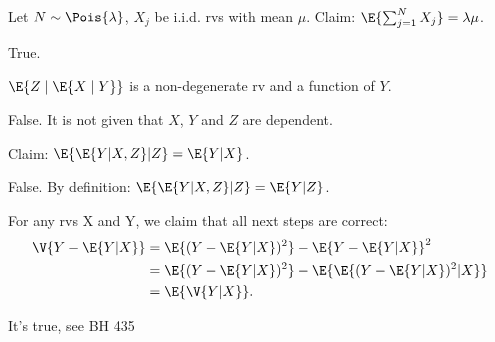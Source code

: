 \documentclass[tf-tutorial-all.tex]{subfiles}
\begin{document}
\begin{truefalse}
Let $N \sim \Pois{\lambda}$, $X_j$ be i.i.d. rvs with mean $\mu$. Claim: $\E{\sum_{j=1}^NX_j}=\lambda\mu$.
\begin{solution}
True.
\end{solution}
\end{truefalse}

\begin{truefalse}
$\E{Z \mid \E{X \mid Y}}$ is a non-degenerate rv and a function of $Y$.
\begin{solution}
False. It is not given that $X$, $Y$ and $Z$ are dependent.
\end{solution}
\end{truefalse}

\begin{truefalse}
Claim: $\E{\E{Y|X,Z}|Z} = \E{Y|X}$.
\begin{solution}
False. By definition: $\E{\E{Y|X,Z}|Z} = \E{Y|Z} $.
\end{solution}
\end{truefalse}

\begin{truefalse}
For any rvs X and Y, we claim that all next steps are correct:
\begin{align*}
\V{Y-\E{Y|X}} &= \E{(Y-\E{Y|X})^2} - \E{Y-\E{Y|X}}^2 \\
  &= \E{(Y-\E{Y|X})^2} - \E{\E{(Y-\E{Y|X})^2|X}} \\
  &= \E{\V{Y|X}}.
\end{align*}
\begin{solution}
It's true, see BH 435
\end{solution}
\end{truefalse}
\end{document}
